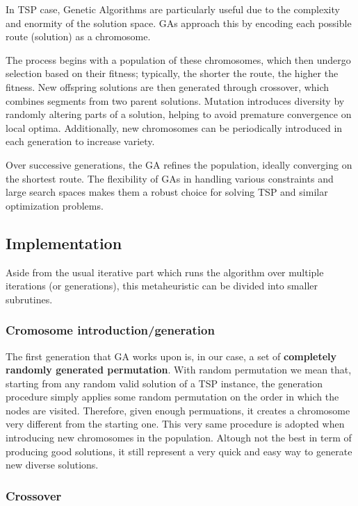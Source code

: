 In TSP case, Genetic Algorithms are particularly useful due to the complexity and enormity of the solution space.
GAs approach this by encoding each possible route (solution) as a chromosome.

The process begins with a population of these chromosomes, which then undergo selection based on their fitness; typically, the shorter the route, the higher the fitness.
New offspring solutions are then generated through crossover, which combines segments from two parent solutions.
Mutation introduces diversity by randomly altering parts of a solution, helping to avoid premature convergence on local optima.
Additionally, new chromosomes can be periodically introduced in each generation to increase variety.

Over successive generations, the GA refines the population, ideally converging on the shortest route.
The flexibility of GAs in handling various constraints and large search spaces makes them a robust choice for solving TSP and similar optimization problems.

\subsection{Implementation}

Aside from the usual iterative part which runs the algorithm over multiple iterations (or generations), this metaheuristic can be divided into smaller subrutines.

\subsubsection{Cromosome introduction/generation}

The first generation that GA works upon is, in our case, a set of \textbf{completely randomly generated permutation}.
With random permutation we mean that, starting from any random valid solution of a TSP instance, the generation procedure simply applies some random permutation on the order in which the nodes are visited.
Therefore, given enough permuations, it creates a chromosome very different from the starting one.
This very same procedure is adopted when introducing new chromosomes in the population.
Altough not the best in term of producing good solutions, it still represent a very quick and easy way to generate new diverse solutions.

\subsubsection{Crossover}

